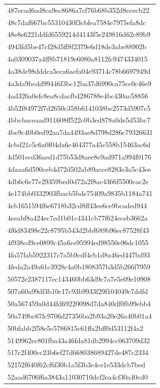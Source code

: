 \begin{tabular}{l}
487ecad6ad8ca9ec8686a7cf76b68b352d8ccecb22 \\
48c7daf667bc55310430f3cbfea7584e7975efa8dc \\
48e8e6221ddfd6559214d4143f5e249816d62c89b9 \\
4943fd5be47cf28d5ff8f2379e6d18de3abe88902b \\
4a0309037a4ff8b71819e6080a8112fc9474334015 \\
4a38de98dddca5eca6aefa04e93714c78b6697949d \\
4a3da9bcdd99446f3bc12ba37d6990ca75cc0c46e9 \\
4ad326a0efc8ea8cdacfb4286788e4bc430ac58856 \\
4b52f84972f7d2650c358b6141038be2573d5907c5 \\
4bbcbaceaad911608ff522c0b3ed878a0de5d53bc7 \\
4be9c40b0ed92aa7da4493ae8d798d286c79326631 \\
4cbd21c5c6a0f04da6c464377a45c558b15463ac6d \\
4d501ecd36aed1d75b53d8aee8e9ad971a994f0176 \\
4daaa6d590ceb4d72d502ab89acce8283e3a5c43ee \\
4db6c6e77e29359bed0d72a2f8ac4366f5500cac2e \\
4e174bb0332903fbacb5bde75409a9835b1184a741 \\
4eb1651594f6e6718b32cd8ff43ee6ce9bcaded944 \\
4eeabf8a424ec7ed1b01c4341cb77f624eceb3662a \\
4f6d83498e22c8795b543d2bbf689b96ec87528f43 \\
4f938cd9ce0899c45a6ce95994ed98550e96dc1055 \\
4fa57fab5922317c7a5b9cdf4cb1d8a46ed447bd93 \\
4feda2a49a61c3928c4a0b1808357b3d5b266f7959 \\
50572e2387117ec143460bb63d9c7a7e5e09e10908 \\
507a60a99df3b10c17c93b9933f29f104049c7ddfd \\
50a567459a0d44fd69220098d7da840df0fb99ebb4 \\
50a749bc67fc9706d27356ba2b93a20e26a40b01a4 \\
50bfabb2f58e5c5786815c61ffa2bff0d53112f4a2 \\
5149962ec801fba43a46fda81db2994cc063709d32 \\
517c2f400cc23b6ef27d668038689427de487c2334 \\
52152f640f62cf6f30b1a5f3b3e4ce1e533dcb7bed \\
52aad6706f6a3843a11030710dcf2ea4cf30a40cd0 \\

\end{tabular}
